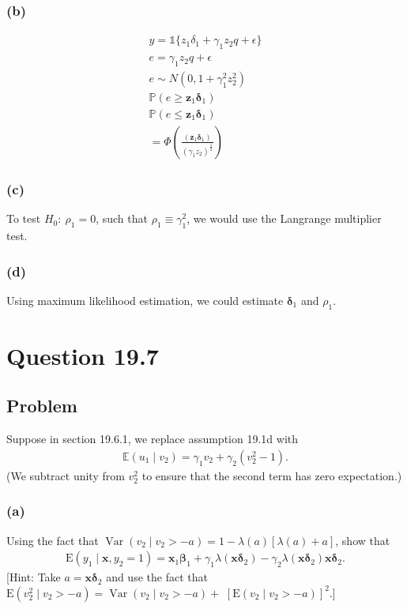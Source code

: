 \documentclass[10pt, a4paper]{article}
\newcommand{\PP}{\mathbb P}
\newcommand{\EE}{\mathbb E}
\begin{document}
    \subsubsection*{(b)}
      \begin{gather*}
        y = \mathbb{1}\{z_1\delta_1+\gamma_1z_2q+\epsilon\} \\
        e = \gamma_1z_2q+\epsilon \\
        e \sim N(0, 1+\gamma_1^2z_2^2) \\
        \PP(e\geq\textbf{z}_1\boldsymbol{\delta}_1) \\
        \PP(e\leq\textbf{z}_1\boldsymbol{\delta}_1) \\
        = \Phi(\frac{(\textbf{z}_1\boldsymbol{\delta}_1)}{(\gamma_1z_2)^{\frac{1}{2}}})
      \end{gather*}
    \subsubsection*{(c)}
      To test $H_0: \ \rho_1 = 0$, such that $\rho_1 \equiv \gamma_1^2$, we would use the Langrange multiplier test.
    \subsubsection*{(d)}
      Using maximum likelihood estimation, we could estimate $\boldsymbol{\delta}_1$ and $\rho_1$. 
\section*{Question 19.7}
  \subsection*{Problem}
    Suppose in section 19.6.1, we replace assumption 19.1d with
    \begin{gather*}
      \EE(u_1 \mid v_2)=\gamma_1 v_2+\gamma_2(v_2^2-1) .
    \end{gather*}
    (We subtract unity from $v_2^2$ to ensure that the second term has zero expectation.)
    \subsubsection*{(a)}
      Using the fact that $\operatorname{Var}(v_2 \mid v_2>-a)=1-\lambda(a)[\lambda(a)+a]$, show that
      \begin{gather*}
        \mathrm{E}(y_1 \mid \mathbf{x}, y_2=1)=\mathbf{x}_1 \boldsymbol{\beta}_1+\gamma_1 \lambda(\mathbf{x} \boldsymbol{\delta}_2)-\gamma_2 \lambda(\mathbf{x} \boldsymbol{\delta}_2) \mathbf{x} \boldsymbol{\delta}_2 .
      \end{gather*}
    [Hint: Take $a=\mathbf{x} \boldsymbol{\delta}_2$ and use the fact that $\mathrm{E}(v_2^2 \mid v_2>-a)=\operatorname{Var}(v_2 \mid v_2>-a)+$ $[\mathrm{E}(v_2 \mid v_2>-a)]^2$.]
\end{document}
